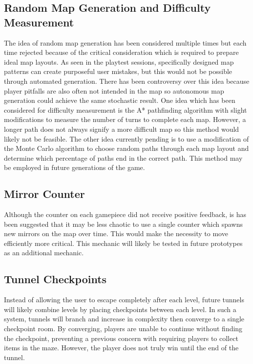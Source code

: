 \documentclass{scrreprt}
\begin{document}
			\subsection{Random Map Generation and Difficulty Measurement}
				The idea of random map generation has been considered multiple times but each time rejected because of the critical consideration which is required to prepare ideal map layouts. As seen in the playtest sessions, specifically designed map patterns can create purposeful user mistakes, but this would not be possible through automated generation. There has been controversy over this idea because player pitfalls are also often not intended in the map so autonomous map generation could achieve the same stochastic result. One idea which has been considered for difficulty measurement is the A* pathfinding algorithm with slight modifications to measure the number of turns to complete each map. However, a longer path does not always signify a more difficult map so this method would likely not be feasible. The other idea currently pending is to use a modification of the Monte Carlo algorithm to choose random paths through each map layout and determine which percentage of paths end in the correct path. This method may be employed in future generations of the game. 
			
			\subsection{Mirror Counter}
				Although the counter on each gamepiece did not receive positive feedback, is has been suggested that it may be less chaotic to use a single counter which spawns new mirrors on the map over time. This would make the necessity to move efficiently more critical. This mechanic will likely be tested in future prototypes as an additional mechanic.
			
			\subsection{Tunnel Checkpoints}
				Instead of allowing the user to escape completely after each level, future tunnels will likely combine levels by placing checkpoints between each level. In such a system, tunnels will branch and increase in complexity then converge to a single checkpoint room. By converging, players are unable to continue without finding the checkpoint, preventing a previous concern with requiring players to collect items in the maze. However, the player does not truly win until the end of the tunnel. 
	
\end{document}
